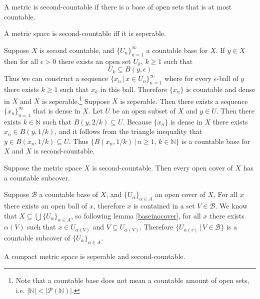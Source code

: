 \documentclass[nobib,notoc]{tufte-handout}
\begin{document}
\begin{defi}
	A metric is second-countable if there is a base of open sets that is at most countable.
\end{defi}
\begin{thm}
	\label{scsep}
	A metric space is second-countable iff it is seperable.
	\begin{IEEEproof}
		Suppose \(X\) is second countable, and \(\{U_n\}_{n=1}^{\infty}\) a countable base for \(X\). If \(y\in X\) then for all \(\epsilon>0\) there exists an open set \(U_k\), \(k\geq 1\) such that
		\begin{equation*}
		U_k\subseteq B(y,\epsilon)
		\end{equation*}
		Thus we can construct a sequence \(\{x_n\,|\, x\in U_n\}_{n=1}^\infty\) where for every \(\epsilon\)-ball of \(y\) there exists \(k\geq 1\) such that \(x_k\) in this ball. Therefore \(\{x_n\}\) is countable and dense in \(X\) and \(X\) is seperable.\footnote{Note that a countable base does not mean a countable amount of open sets, i.e. \(\lvert\mathbb{N}\rvert<\lvert\mathscr{P}(\mathbb{N})\rvert\).}\bigbreak
		Suppose \(X\) is seperable. Then there exists a sequence \(\{x_n\}_{n=1}^\infty\) that is dense in \(X\). Let \(U\) be an open subset of \(X\) and \(y\in U\). Then there exists \(k\in\mathbb{N}\) such that \(B(y,2/k)\subseteq U\). Because \(\{x_n\}\) is dense in \(X\) there exists \(x_n\in B(y,1/k)\), and it follows from the triangle inequality that \(y\in B(x_n,1/k)\subseteq U\). Thus \(\{B(x_n,1/k)\,|\,n\geq 1,\,k\in\mathbb{N}\}\) is a countable base for \(X\) and \(X\) is second-countable.
	\end{IEEEproof}
\end{thm}
\begin{thm}
	\label{lindelofs}
	Suppose the metric space \(X\) is second-countable. Then every open cover of \(X\) has a countable subcover.
	\begin{IEEEproof}
		Suppose \(\mathscr{B}\) a countable base of \(X\), and \(\{U_\alpha\}_{\alpha\in A}\) an open cover of \(X\). For all \(x\) there exists an open ball of \(x\), therefore \(x\) is contained in a set \(V\in\mathscr{B}\). We know that \(X\subseteq\bigcup\{U_\alpha\}_{\alpha\in A}\), so following lemma \ref{baseinocover}, for all \(x\) there exists \(\alpha(V)\) such that \(x\in U_{\alpha(V)}\) and \(V\subseteq U_{\alpha(V)}\). Therefore \(\{U_{\alpha(v)}\,|\,V\in\mathscr{B}\}\) is a countable subcover of \(\{U_{\alpha}\}_{\alpha\in A}\).
	\end{IEEEproof}
\end{thm}
\begin{thm}
	A compact metric space is seperable and second-countable.
\end{thm}
\end{document}
